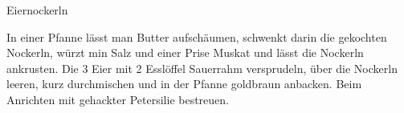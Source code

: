 \begin{recipe}[\vegetarian]{Eiernockerln}%

    \begin{ingredients}
        \entrysection{}
    \end{ingredients}

    \begin{instructions}
        In einer Pfanne lässt man Butter aufschäumen, schwenkt darin die gekochten Nockerln, würzt min Salz und einer Prise Muskat und lässt die Nockerln ankrusten.
        Die 3 Eier mit 2 Esslöffel Sauerrahm versprudeln, über die Nockerln leeren, kurz durchmischen und in der Pfanne goldbraun anbacken.
        Beim Anrichten mit gehackter Petersilie bestreuen.
    \end{instructions}
\end{recipe}
